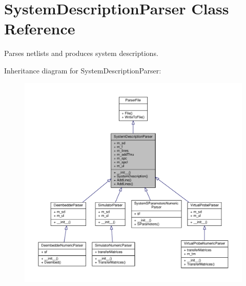 \hypertarget{classSignalIntegrity_1_1Parsers_1_1SystemDescriptionParser_1_1SystemDescriptionParser}{}\section{System\+Description\+Parser Class Reference}
\label{classSignalIntegrity_1_1Parsers_1_1SystemDescriptionParser_1_1SystemDescriptionParser}


Parses netlists and produces system descriptions.  




Inheritance diagram for System\+Description\+Parser\+:
\nopagebreak
\begin{figure}[H]
\begin{center}
\leavevmode
\includegraphics[width=350pt]{classSignalIntegrity_1_1Parsers_1_1SystemDescriptionParser_1_1SystemDescriptionParser__inherit__graph}
\end{center}
\end{figure}


